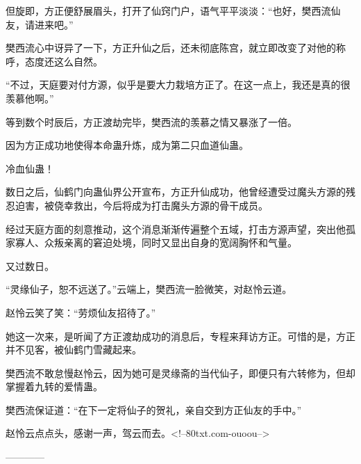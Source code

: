 \begin{this_body}
但旋即，方正便舒展眉头，打开了仙窍门户，语气平平淡淡：“也好，樊西流仙友，请进来吧。”

樊西流心中讶异了一下，方正升仙之后，还未彻底陈宫，就立即改变了对他的称呼，态度还这么自然。

“不过，天庭要对付方源，似乎是要大力栽培方正了。在这一点上，我还是真的很羡慕他啊。”

等到数个时辰后，方正渡劫完毕，樊西流的羡慕之情又暴涨了一倍。

因为方正成功地使得本命蛊升炼，成为第二只血道仙蛊。

冷血仙蛊！

数日之后，仙鹤门向蛊仙界公开宣布，方正升仙成功，他曾经遭受过魔头方源的残忍迫害，被侥幸救出，今后将成为打击魔头方源的骨干成员。

经过天庭方面的刻意推动，这个消息渐渐传遍整个五域，打击方源声望，突出他孤家寡人、众叛亲离的窘迫处境，同时又显出自身的宽阔胸怀和气量。

又过数日。

“灵缘仙子，恕不远送了。”云端上，樊西流一脸微笑，对赵怜云道。

赵怜云笑了笑：“劳烦仙友招待了。”

她这一次来，是听闻了方正渡劫成功的消息后，专程来拜访方正。可惜的是，方正并不见客，被仙鹤门雪藏起来。

樊西流不敢怠慢赵怜云，因为她可是灵缘斋的当代仙子，即便只有六转修为，但却掌握着九转的爱情蛊。

樊西流保证道：“在下一定将仙子的贺礼，亲自交到方正仙友的手中。”

赵怜云点点头，感谢一声，驾云而去。<!--80txt.com-ouoou-->

------------

\end{this_body}

